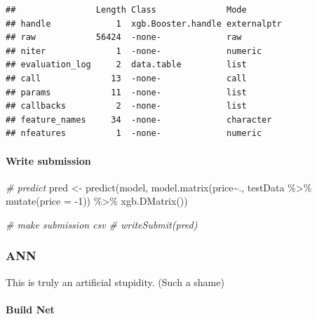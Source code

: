 \documentclass[
]{article}
\newenvironment{Shaded}{\begin{snugshade}}{\end{snugshade}}
\newcommand{\AttributeTok}[1]{\textcolor[rgb]{0.77,0.63,0.00}{#1}}
\newcommand{\CommentTok}[1]{\textcolor[rgb]{0.56,0.35,0.01}{\textit{#1}}}
\newcommand{\DecValTok}[1]{\textcolor[rgb]{0.00,0.00,0.81}{#1}}
\newcommand{\FunctionTok}[1]{\textcolor[rgb]{0.00,0.00,0.00}{#1}}
\newcommand{\NormalTok}[1]{#1}
\newcommand{\OtherTok}[1]{\textcolor[rgb]{0.56,0.35,0.01}{#1}}
\newcommand{\SpecialCharTok}[1]{\textcolor[rgb]{0.00,0.00,0.00}{#1}}
\begin{document}
\begin{verbatim}
##                Length Class              Mode       
## handle             1  xgb.Booster.handle externalptr
## raw            56424  -none-             raw        
## niter              1  -none-             numeric    
## evaluation_log     2  data.table         list       
## call              13  -none-             call       
## params            11  -none-             list       
## callbacks          2  -none-             list       
## feature_names     34  -none-             character  
## nfeatures          1  -none-             numeric
\end{verbatim}

\hypertarget{write-submission}{%
\paragraph{Write submission}\label{write-submission}}

\begin{Shaded}
\begin{Highlighting}[]
\CommentTok{\# predict }
\NormalTok{pred }\OtherTok{\textless{}{-}}
  \FunctionTok{predict}\NormalTok{(model, }\FunctionTok{model.matrix}\NormalTok{(price}\SpecialCharTok{\textasciitilde{}}\NormalTok{., testData }\SpecialCharTok{\%\textgreater{}\%} \FunctionTok{mutate}\NormalTok{(}\AttributeTok{price =} \SpecialCharTok{{-}}\DecValTok{1}\NormalTok{)) }\SpecialCharTok{\%\textgreater{}\%} \FunctionTok{xgb.DMatrix}\NormalTok{())}

\CommentTok{\# make submission csv}
\CommentTok{\# writeSubmit(pred)}
\end{Highlighting}
\end{Shaded}

\hypertarget{ann}{%
\subsubsection{ANN}\label{ann}}

This is truly an artificial stupidity. (Such a shame)

\hypertarget{build-net}{%
\paragraph{Build Net}\label{build-net}}
\end{document}
